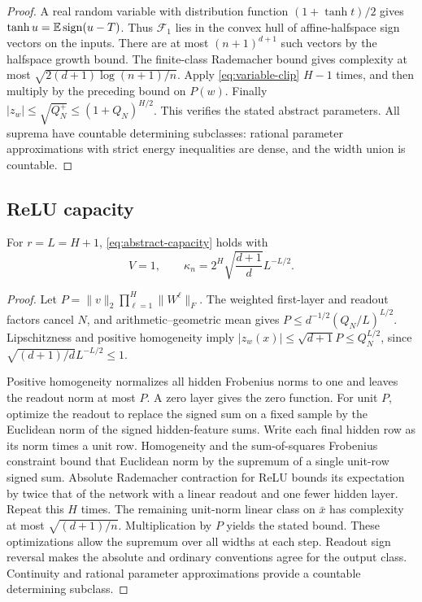 \begin{proof}
A real random variable with distribution function $(1+\tanh t)/2$ gives
$\tanh u=\mathbb E\operatorname{sign}(u-T)$. Thus $\mathcal F_1$ lies in the convex hull of affine-halfspace sign vectors on the inputs. There are at most $(n+1)^{d+1}$ such vectors by the halfspace growth bound. The finite-class Rademacher bound gives complexity at most
$\sqrt{2(d+1)\log(n+1)/n}$. Apply \eqref{eq:variable-clip} $H-1$ times, and then multiply by the preceding bound on $P(w)$.
Finally $|z_w|\le\sqrt{Q_N^+}\le(1+Q_N)^{H/2}$. This verifies the stated abstract parameters. All suprema have countable determining subclasses: rational parameter approximations with strict energy inequalities are dense, and the width union is countable.
\end{proof}

\subsection{ReLU capacity}
\begin{lemma}
\label{lem:relu-capacity}
For $r=L=H+1$, \eqref{eq:abstract-capacity} holds with
\begin{equation}
 V=1,\qquad \kappa_n=2^H\sqrt{\frac{d+1}{d}}L^{-L/2}.
 \label{eq:relu-capacity-constant}
\end{equation}
\end{lemma}
\begin{proof}
Let $P=\|v\|_2\prod_{\ell=1}^H\|W^\ell\|_F$. The weighted first-layer and readout factors cancel $N$, and arithmetic--geometric mean gives
$P\le d^{-1/2}(Q_N/L)^{L/2}$. Lipschitzness and positive homogeneity imply
$|z_w(x)|\le\sqrt{d+1}P\le Q_N^{L/2}$, since
$\sqrt{(d+1)/d}L^{-L/2}\le1$.

Positive homogeneity normalizes all hidden Frobenius norms to one and leaves the readout norm at most $P$. A zero layer gives the zero function. For unit $P$, optimize the readout to replace the signed sum on a fixed sample by the Euclidean norm of the signed hidden-feature sums. Write each final hidden row as its norm times a unit row. Homogeneity and the sum-of-squares Frobenius constraint bound that Euclidean norm by the supremum of a single unit-row signed sum. Absolute Rademacher contraction for ReLU bounds its expectation by twice that of the network with a linear readout and one fewer hidden layer. Repeat this $H$ times. The remaining unit-norm linear class on $\bar x$ has complexity at most $\sqrt{(d+1)/n}$. Multiplication by $P$ yields the stated bound. These optimizations allow the supremum over all widths at each step. Readout sign reversal makes the absolute and ordinary conventions agree for the output class. Continuity and rational parameter approximations provide a countable determining subclass.
\end{proof}
